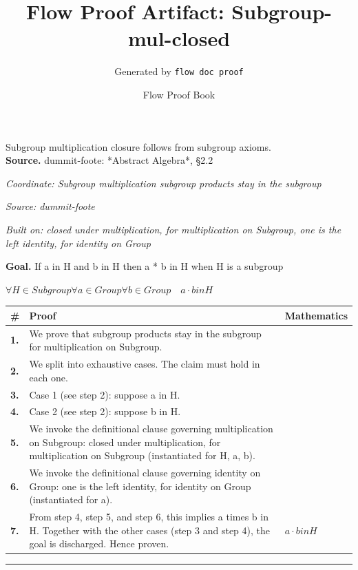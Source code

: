 \documentclass[11pt]{article}
\title{Flow Proof Artifact: Subgroup-mul-closed}
\author{Generated by \texttt{flow doc proof}}
\date{Flow Proof Book}
\theoremstyle{definition}
\begin{document}
\maketitle
Subgroup multiplication closure follows from subgroup axioms.\\[0.5em]
\textbf{Source.} dummit-foote: *Abstract Algebra*, §2.2\\[0.5em]
\bigskip
{}\par
\smallskip\noindent\textit{Coordinate: Subgroup \cdot multiplication \cdot subgroup products stay in the subgroup}\par
\smallskip\noindent\textit{Source: dummit-foote}\par
\smallskip\noindent\textit{Built on: closed under multiplication, for multiplication on Subgroup, one is the left identity, for identity on Group}\par
\medskip
\noindent\textbf{Goal.} If a in H and b in H then a * b in H when H is a subgroup\par
\noindent$\displaystyle \forall H \in Subgroup \forall a \in Group \forall b \in Group\quad a \cdot b in H$\par
\medskip
\noindent
\begin{tabular}{@{} >{\raggedright\arraybackslash}p{} >{\raggedright\arraybackslash}p{} >{\raggedleft\arraybackslash}p{} @{}}
\textbf{\#} & \textbf{Proof} & \textbf{Mathematics} \\
\midrule
\textbf{1.} & We prove that subgroup products stay in the subgroup for multiplication on Subgroup. & \\[0.45em]
\textbf{2.} & We split into exhaustive cases. The claim must hold in each one. & \\[0.45em]
\textbf{3.} & Case 1 (see step 2): suppose a in H. & \\[0.45em]
\textbf{4.} & Case 2 (see step 2): suppose b in H. & \\[0.45em]
\textbf{5.} & We invoke the definitional clause governing multiplication on Subgroup: closed under multiplication, for multiplication on Subgroup (instantiated for H, a, b). & \\[0.45em]
\textbf{6.} & We invoke the definitional clause governing identity on Group: one is the left identity, for identity on Group (instantiated for a). & \\[0.45em]
\textbf{7.} & From step 4, step 5, and step 6, this implies a times b in H. Together with the other cases (step 3 and step 4), the goal is discharged. Hence proven. & $\displaystyle a \cdot b in H$ \\[0.45em]
\bottomrule
\end{tabular}
\label{thm:Subgroup-multiplication-subgroup_products_stay_in_the_subgroup}
\par\medskip\hrule
\end{document}
